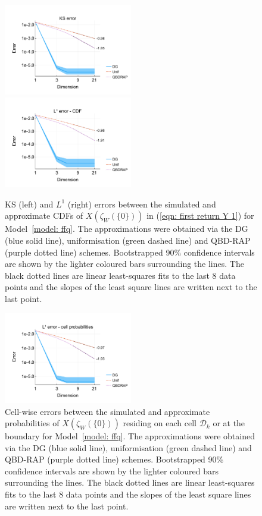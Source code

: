 \begin{figure}[h]
	\centering
	\includegraphics[width=0.5\textwidth,trim={0.75cm 0.8cm 0.25cm 1.25cm},clip]{chapter6/figs/ffq/cts/ks_error_formatted.pdf}%
	\includegraphics[width=0.5\textwidth,trim={0.75cm 0.8cm 0.25cm 1.25cm},clip]{chapter6/figs/ffq/cts/l1_cdf_error_formatted.pdf}
	\caption{KS (left) and \(L^1\) (right) errors between the simulated and approximate CDFs of \(X(\zeta_{W}(\{0\}))\) in (\ref{eqn: first return Y 1}) for Model~\ref{model: ffq}. The approximations were obtained via the DG (blue solid line), uniformisation (green dashed line) and QBD-RAP (purple dotted line) schemes. Bootstrapped 90\% confidence intervals are shown by the lighter coloured bars surrounding the lines. The black dotted lines are linear least-squares fits to the last 8 data points and the slopes of the least square lines are written next to the last point.} 
	\label{fig: ffq return cts} 
\end{figure}
\begin{figure}[h]
	\centering
	\includegraphics[width=0.5\textwidth,trim={0.75cm 0.8cm 0.25cm 1.25cm},clip]{chapter6/figs/ffq/cts/l1_cell_probs_error_formatted.pdf}%
	\caption{Cell-wise errors between the simulated and approximate probabilities of \(X(\zeta_{W}(\{0\}))\) residing on each cell \(\mathcal D_k\) or at the boundary for Model~\ref{model: ffq}. The approximations were obtained via the DG (blue solid line), uniformisation (green dashed line) and QBD-RAP (purple dotted line) schemes. Bootstrapped 90\% confidence intervals are shown by the lighter coloured bars surrounding the lines. The black dotted lines are linear least-squares fits to the last 8 data points and the slopes of the least square lines are written next to the last point.} 
	\label{fig: ffq cell probs} 
\end{figure}
